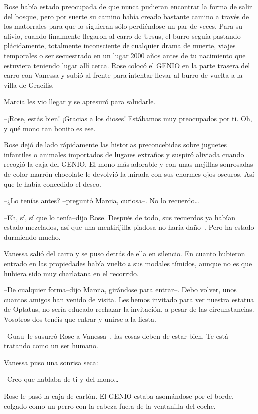Rose había estado preocupada de que nunca pudieran encontrar la forma de
salir del bosque, pero por suerte su camino había creado bastante camino
a través de los matorrales para que lo siguieran sólo perdiéndose un par
de veces. Para su alivio, cuando finalmente llegaron al carro de Ursus,
el burro seguía pastando plácidamente, totalmente inconsciente de
cualquier drama de muerte, viajes temporales o ser secuestrado en un
lugar 2000 años antes de tu nacimiento que estuviera teniendo lugar allí
cerca. Rose colocó el GENIO en la parte trasera del carro con Vanessa y
subió al frente para intentar llevar al burro de vuelta a la villa de
Gracilis.

Marcia les vio llegar y se apresuró para saludarle.

--¡Rose, estás bien! ¡Gracias a los dioses! Estábamos muy preocupados
por ti. Oh, y qué mono tan bonito es ese.

Rose dejó de lado rápidamente las historias preconcebidas sobre juguetes
infantiles o animales importados de lugares extraños y suspiró aliviada
cuando recogió la caja del GENIO. El mono más adorable y con unas
mejillas sonrosadas de color marrón chocolate le devolvió la mirada con
sus enormes ojos oscuros. Así que le había concedido el deseo.

--¿Lo tenías antes? --preguntó Marcia, curiosa--. No lo recuerdo\ldots{}

--Eh, sí, sí que lo tenía--dijo Rose. Después de todo, sus recuerdos ya
habían estado mezclados, así que una mentirijilla piadosa no haría
daño--. Pero ha estado durmiendo mucho.

Vanessa salió del carro y se puso detrás de ella en silencio. En cuanto
hubieron entrado en las propiedades había vuelto a sus modales tímidos,
aunque no es que hubiera sido muy charlatana en el recorrido.

--De cualquier forma--dijo Marcia, girándose para entrar--. Debo volver,
unos cuantos amigos han venido de visita. Les hemos invitado para ver
nuestra estatua de Optatus, no sería educado rechazar la invitación, a
pesar de las circunstancias. Vosotros dos tenéis que entrar y unirse a
la fiesta.

--Guau--le susurró Rose a Vanessa--, las cosas deben de estar bien. Te
está tratando como un ser humano.

Vanessa puso una sonrisa seca:

--Creo que hablaba de ti y del mono\ldots{}

Rose le pasó la caja de cartón. El GENIO estaba asomándose por el borde,
colgado como un perro con la cabeza fuera de la ventanilla del coche.

